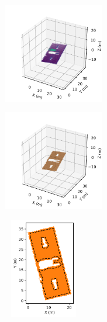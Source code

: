 
\begin{figure}[t]
  \centering
  \begin{subfigure}[b]{0.45\linewidth}
    \centering\includegraphics[clip, trim=1.6cm 0.2cm 0.1cm 0.5cm, width=125pt]{chapter_5_mapping/imgs/74200284_points.pdf}
    \caption{\label{fig:ch5_pc_example}}
  \end{subfigure}
  \begin{subfigure}[b]{0.45\linewidth}
    \centering\includegraphics[clip, trim=1.6cm 0.2cm 0.1cm 0.5cm, width=125pt]{chapter_5_mapping/imgs/74200284_trimesh.pdf}
    \caption{\label{fig:ch5_trimesh_example}}
  \end{subfigure}
  \begin{subfigure}[b]{0.45\linewidth}
    \centering\includegraphics[width=100pt,height=125pt]{chapter_5_mapping/imgs/74200284_polygonbuffer.pdf}
    \caption{\label{fig:ch5_polygon_example}}
  \end{subfigure}
  \begin{subfigure}[b]{0.5\linewidth}

\end{subfigure}
\end{figure}
